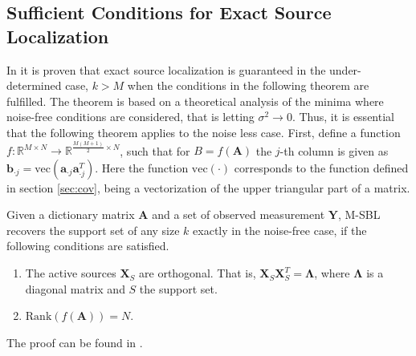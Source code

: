 \subsection{Sufficient Conditions for Exact Source Localization}
In \cite{Balkan2014} it is proven that exact source localization is guaranteed in the under-determined case, $k > M$ when the conditions in the following theorem are fulfilled.
The theorem is based on a theoretical analysis of the minima where noise-free conditions are considered, that is letting $\sigma^2 \rightarrow 0$. Thus, it is essential that the following theorem applies to the noise less case. 
First, define a function $f:\mathbb{R}^{M \times N} \rightarrow \mathbb{R}^{\frac{M(M+1)}{2}\times N}$, such that for $B = f(\mathbf{A})$ the $j$-th column is given as $\mathbf{b}_{\cdot j} = \text{vec}(\mathbf{a}_{\cdot j}\mathbf{a}_{\cdot j}^T)$. Here the function $\text{vec}(\cdot)$ corresponds to the function defined in section \ref{sec:cov}, being a vectorization of the upper triangular part of a matrix. 
\begin{theorem}
Given a dictionary matrix $\mathbf{A}$ and a set of observed measurement $\mathbf{Y}$, M-SBL recovers the support set of any size $k$ exactly in the noise-free case, if the following conditions are satisfied. 
\begin{enumerate}
\item The active sources $\mathbf{X}_S$ are orthogonal. That is, $\mathbf{X}_S \mathbf{X}_S^T = \boldsymbol{\Lambda}$, where $\boldsymbol{\Lambda}$ is a diagonal matrix and $S$ the support set.
\item $\text{Rank}(f(\mathbf{A}))= N$.
\end{enumerate}
The proof can be found in \cite[p. 16]{Balkan2014}.


\label{th:conditions}
\end{theorem}  

